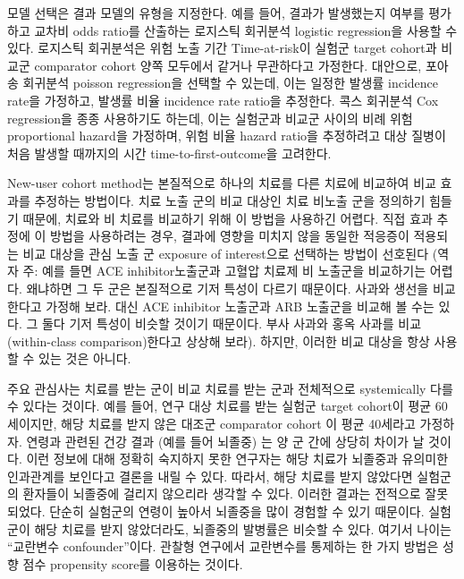 \documentclass[11pt]{book}
\theoremstyle{definition}
\theoremstyle{definition}
\theoremstyle{definition}
\theoremstyle{remark}
\let\BeginKnitrBlock\begin \let\EndKnitrBlock\end
\begin{document}
모델 선택은 결과 모델의 유형을 지정한다. 예를 들어, 결과가 발생했는지
여부를 평가하고 교차비 odds ratio를 산출하는 로지스틱 회귀분석 logistic
regression을 사용할 수 있다. 로지스틱 회귀분석은 위험 노출 기간
Time-at-risk이 실험군 target cohort과 비교군 comparator cohort 양쪽
모두에서 같거나 무관하다고 가정한다. 대안으로, 포아송 회귀분석 poisson
regression을 선택할 수 있는데, 이는 일정한 발생률 incidence rate을
가정하고, 발생률 비율 incidence rate ratio을 추정한다. 콕스 회귀분석 Cox
regression을 종종 사용하기도 하는데, 이는 실험군과 비교군 사이의 비례
위험 proportional hazard을 가정하며, 위험 비율 hazard ratio을 추정하려고
대상 질병이 처음 발생할 때까지의 시간 time-to-first-outcome을 고려한다.
 

\BeginKnitrBlock{rmdimportant}
New-user cohort method는 본질적으로 하나의 치료를 다른 치료에 비교하여
비교 효과를 추정하는 방법이다. 치료 노출 군의 비교 대상인 치료 비노출
군을 정의하기 힘들기 때문에, 치료와 비 치료를 비교하기 위해 이 방법을
사용하긴 어렵다. 직접 효과 추정에 이 방법을 사용하려는 경우, 결과에
영향을 미치지 않을 동일한 적응증이 적용되는 비교 대상을 관심 노출 군
exposure of interest으로 선택하는 방법이 선호된다 (역자 주: 예를 들면
ACE inhibitor노출군과 고혈압 치료제 비 노출군을 비교하기는 어렵다.
왜냐하면 그 두 군은 본질적으로 기저 특성이 다르기 때문이다. 사과와
생선을 비교한다고 가정해 보라. 대신 ACE inhibitor 노출군과 ARB 노출군을
비교해 볼 수는 있다. 그 둘다 기저 특성이 비슷할 것이기 때문이다. 부사
사과와 홍옥 사과를 비교 (within-class comparison)한다고 상상해 보라).
하지만, 이러한 비교 대상을 항상 사용할 수 있는 것은 아니다.
\EndKnitrBlock{rmdimportant}

주요 관심사는 치료를 받는 군이 비교 치료를 받는 군과 전체적으로
systemically 다를 수 있다는 것이다. 예를 들어, 연구 대상 치료를 받는
실험군 target cohort이 평균 60세이지만, 해당 치료를 받지 않은 대조군
comparator cohort 이 평균 40세라고 가정하자. 연령과 관련된 건강 결과
(예를 들어 뇌졸중) 는 양 군 간에 상당히 차이가 날 것이다. 이런 정보에
대해 정확히 숙지하지 못한 연구자는 해당 치료가 뇌졸중과 유의미한
인과관계를 보인다고 결론을 내릴 수 있다. 따라서, 해당 치료를 받지
않았다면 실험군의 환자들이 뇌졸중에 걸리지 않으리라 생각할 수 있다.
이러한 결과는 전적으로 잘못되었다. 단순히 실험군의 연령이 높아서
뇌졸중을 많이 경험할 수 있기 때문이다. 실험군이 해당 치료를 받지
않았더라도, 뇌졸중의 발병률은 비슷할 수 있다. 여기서 나이는 ``교란변수
confounder''이다. 관찰형 연구에서 교란변수를 통제하는 한 가지 방법은
성향 점수 propensity score를 이용하는 것이다. 
\end{document}

